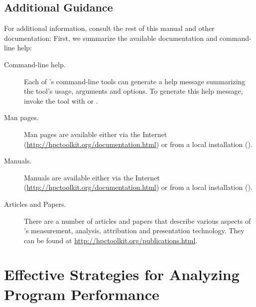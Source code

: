 \documentclass[11pt,letterpaper]{report}
\begin{document}

\section{Additional Guidance}

For additional information, consult the rest of this manual and other documentation:
First, we summarize the available documentation and command-line help:

\begin{description}

\item[Command-line help.]\hfill

Each of \HPCToolkit{}'s command-line tools can generate a help message summarizing the tool's usage, arguments and options.
To generate this help message, invoke the tool with  or .

\item[Man pages.]\hfill

Man pages are available either via the Internet (\url{http://hpctoolkit.org/documentation.html}) or from a local \HPCToolkit{} installation ().

\item[Manuals.]\hfill

Manuals are available either via the Internet (\url{http://hpctoolkit.org/documentation.html}) or from a local \HPCToolkit{} installation ().

\item[Articles and Papers.]\hfill

There are a number of articles and papers that describe various aspects of \HPCToolkit{}'s measurement, analysis, attribution and presentation technology.
They can be found at \url{http://hpctoolkit.org/publications.html}.

\end{description}



\chapter{Effective Strategies for Analyzing Program Performance}
\label{chpt:effective-performance-analysis}
\end{document}
